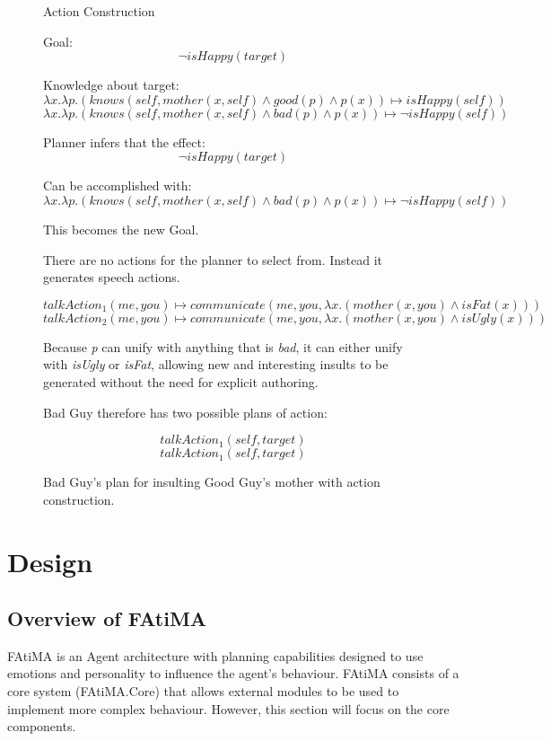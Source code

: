 \documentclass{article}
\begin{document}
\begin{figure}[h!]
  
  \begin{center}\large{Action Construction}\end{center}

  Goal:
  $$
  \neg isHappy(target)
  $$

  Knowledge about target:
  \[
  \lambda x.\lambda p.(knows(self, mother(x,self) \wedge good(p) \wedge p(x)) \mapsto isHappy(self))
  \]
  \[
  \lambda x.\lambda p.(knows(self, mother(x,self) \wedge bad(p) \wedge p(x)) \mapsto \neg isHappy(self))
  \]

  Planner infers that the effect:
  \[
  \neg isHappy(target)
  \]

  Can be accomplished with:
  \[
  \lambda x.\lambda p.(knows(self, mother(x,self) \wedge bad(p) \wedge p(x)) \mapsto \neg isHappy(self))
  \]

  This becomes the new Goal.

  There are no actions for the planner to select from.  Instead it generates speech
  actions.

  \[
  talkAction_1(me, you) \mapsto communicate(me, you, \lambda x.(mother(x, you) \wedge isFat(x)))
  \]
  \[
  talkAction_2(me, you) \mapsto communicate(me, you, \lambda x.(mother(x, you) \wedge isUgly(x)))
  \]

  Because \emph{p} can unify with anything that is \emph{bad}, it can either unify with
  \emph{isUgly} or \emph{isFat}, allowing new and interesting insults to be generated
  without the need for explicit authoring.

  Bad Guy therefore has two possible plans of action:

  \[
  talkAction_1(self, target)
  \]
  \[
  talkAction_1(self, target)
  \]

  \caption{Bad Guy's plan for insulting Good Guy's mother with action construction.}
  \label{plan_construction}
\end{figure}

\section{Design}

\subsection{Overview of FAtiMA}

FAtiMA is an Agent architecture with planning capabilities designed to use emotions
and personality to influence the agent's behaviour\cite{Mascarenhas}.  FAtiMA consists
of a core system (FAtiMA.Core) that allows external modules to be used to implement more
complex behaviour.  However, this section will focus on the core components.
\end{document}
